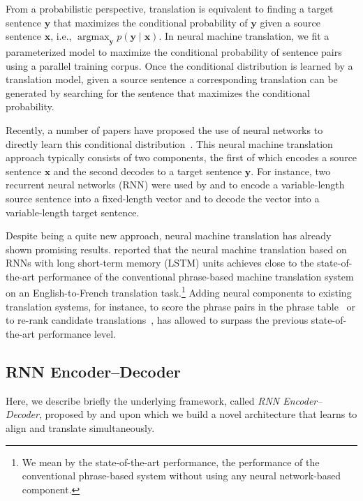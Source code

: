 \documentclass{article}
\newcommand{\vect}[1]{\mathbf{#1}}
\newcommand{\vx}[0]{\vect{x}}
\newcommand{\vy}[0]{\vect{y}}
\DeclareMathOperator*{\argmax}{\arg \max}
\begin{document}
From a probabilistic perspective, translation is equivalent to finding a target
sentence $\vy$ that maximizes the conditional probability of $\vy$ given a
source sentence $\vx$, i.e., $\argmax_{\vy} p(\vy \mid \vx)$.  In neural
machine translation, we fit a parameterized model to maximize the conditional
probability of sentence pairs using a parallel training corpus. Once the
conditional distribution is learned by a translation model, given a source
sentence a corresponding translation can be generated by searching for the
sentence that maximizes the conditional probability.

Recently, a number of papers have proposed the use of neural networks to
directly learn this conditional distribution~\citep[see,
e.g.,][]{Kalchbrenner2013,Cho2014,Sutskever2014,Cho2014a,Forcada1997}. This
neural machine translation approach typically consists of two components, the
first of which encodes a source sentence $\vx$ and the second decodes to a
target sentence $\vy$. For instance, two recurrent neural networks (RNN) were
used by \citep{Cho2014} and \citep{Sutskever2014} to encode a variable-length
source sentence into a fixed-length vector and to decode the vector into a
variable-length target sentence.

Despite being a quite new approach, neural machine translation has already
shown promising results. \citet{Sutskever2014} reported that the neural machine
translation based on RNNs with long short-term memory (LSTM) units achieves
close to the state-of-the-art performance of the conventional phrase-based
machine translation system on an English-to-French translation task.\footnote{
    We mean by the state-of-the-art performance, the performance of the
    conventional phrase-based system without using any neural network-based
    component.
} 
Adding neural components to existing translation systems, for instance,
to score the phrase pairs in the phrase table~\citep{Cho2014} or to re-rank
candidate translations~\citep{Sutskever2014}, has allowed to
surpass the previous state-of-the-art performance level.

\subsection{RNN Encoder--Decoder}

Here, we describe briefly the underlying framework, called {\it RNN
Encoder--Decoder}, proposed by \citet{Cho2014} and \citet{Sutskever2014} upon
which we build a novel architecture that learns to align and translate
simultaneously.
\end{document}
